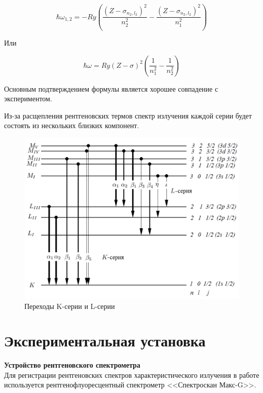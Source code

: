 \documentclass[a4paper, 12pt]{article}%
\begin{document}
		\[\hbar \omega_{1,2} = - Ry \left( \frac{(Z - \sigma_{n_2,  l_2})^2}{n_2^2} - \frac{(Z - \sigma_{n_2,  l_2})^2}{n_1^2} \right)\]

		Или

		\[\hbar \omega = Ry (Z - \sigma)^2 \left( \frac{1}{n_1^2} - \frac{1}{n_2^2}\right)\]

		Основным подтверждением формулы является хорошее совпадение с экспериментом.  
				
		Из-за расщепления рентгеновских термов спектр излучения каждой серии будет состоять из нескольких близких компонент. 

		\begin{figure}[h!]
			\centering
			\includegraphics[scale=0.35]{Переходы.png}
			\caption{Переходы K-серии и L-серии}
		\end{figure}

	\newpage

    \section*{Экспериментальная установка}
		
		\textbf{Устройство рентгеновского спектрометра}\\
			
		Для регистрации рентгеновских спектров характеристического излучения в работе используется рентгенофлуоресцентный спектрометр <<Спектроскан Макс-G>>. 
				
\end{document}
